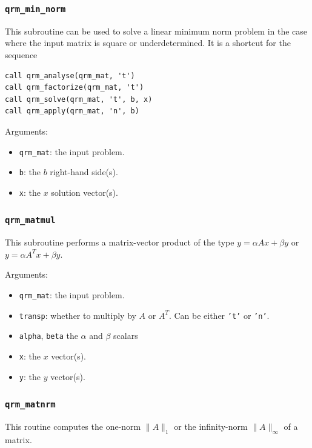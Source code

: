 \documentclass[11pt]{article}
\begin{document}
\subsubsection{\texttt{qrm\_min\_norm}}
This subroutine can be used to solve a linear minimum norm problem in
the case where the input matrix is square or underdetermined. It is a
shortcut for the sequence 
\begin{lstlisting}
call qrm_analyse(qrm_mat, 't')  
call qrm_factorize(qrm_mat, 't')  
call qrm_solve(qrm_mat, 't', b, x)  
call qrm_apply(qrm_mat, 'n', b)  
\end{lstlisting}
%

\noindent Arguments:
\begin{itemize}
\item \texttt{qrm\_mat}: the input problem.
\item \texttt{b}: the $b$ right-hand side(s).
\item \texttt{x}: the $x$ solution vector(s).
\end{itemize}



\subsubsection{\texttt{qrm\_matmul}}
This subroutine performs a matrix-vector product of the type $y =
\alpha Ax + \beta y$ or $y =\alpha A^Tx + \beta y$.


\noindent Arguments:
\begin{itemize}
\item \texttt{qrm\_mat}: the input problem.
\item \texttt{transp}: whether to multiply by $A$ or $A^T$. Can be either
  \texttt{'t'} or \texttt{'n'}.
\item \texttt{alpha}, \texttt{beta} the $\alpha$ and $\beta$ scalars
\item \texttt{x}: the $x$ vector(s).
\item \texttt{y}: the $y$ vector(s).
\end{itemize}

\subsubsection{\texttt{qrm\_matnrm}}
This routine computes the one-norm $\|A\|_1$ or the infinity-norm
$\|A\|_\infty$ of a matrix.
\end{document}

